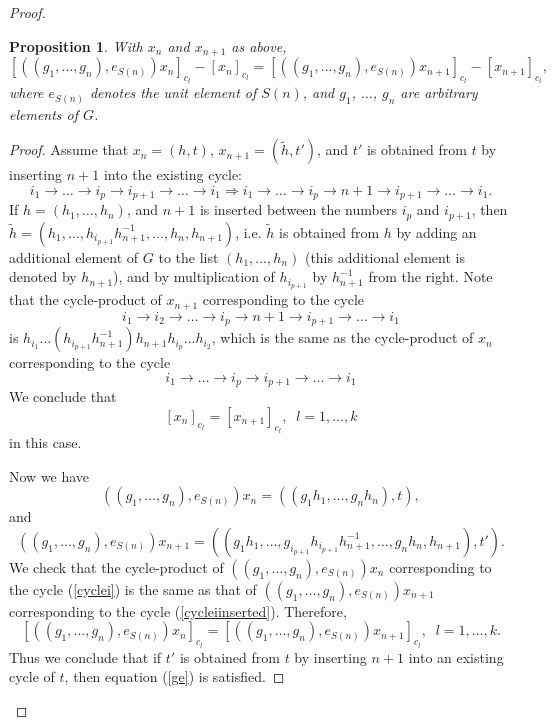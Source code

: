 \documentclass[10pt,a4paper]{amsart}
\newtheorem{prop}{Proposition}
\begin{document}
\begin{proof}
\begin{prop}\label{PROPOSITIONCoW1} With $x_n$ and $x_{n+1}$ as above,
\begin{equation}\label{ge}
\left[\left(\left(g_1,\ldots,g_n\right),e_{S(n)}\right)x_n\right]_{c_l}-\left[x_n\right]_{c_l}
=\left[\left(\left(g_1,\ldots,g_n\right),e_{S(n)}\right)x_{n+1}\right]_{c_l}-\left[x_{n+1}\right]_{c_l},
\end{equation}
where $e_{S(n)}$ denotes the unit element of $S(n)$, and $g_1$, $\ldots$, $g_n$ are arbitrary elements of $G$.
\end{prop}
\begin{proof} Assume that $x_n=(h,t)$, $x_{n+1}=\left(\tilde{h},t'\right)$, and $t'$ is obtained from $t$ by inserting $n+1$ into the existing cycle:
$$
i_1\rightarrow \ldots\rightarrow i_p\rightarrow i_{p+1}\rightarrow\ldots\rightarrow i_1\Longrightarrow
i_1\rightarrow\ldots\rightarrow i_{p}\rightarrow n+1\rightarrow i_{p+1}\rightarrow\ldots\rightarrow i_1.
$$
If $h=\left(h_1,\ldots,h_n\right)$,  and $n+1$ is inserted between the numbers $i_p$ and $i_{p+1}$,
then $\tilde{h}=\left(h_1,\ldots,h_{i_{p+1}}h_{n+1}^{-1},\ldots,h_n,h_{n+1}\right)$,
i.e. $\tilde{h}$ is obtained from $h$ by adding an additional element of $G$ to the list $\left(h_1,\ldots,h_n\right)$
(this additional element is denoted by $h_{n+1}$), and by multiplication of $h_{i_{p+1}}$ by $h_{n+1}^{-1}$ from the right. Note that  the cycle-product of $x_{n+1}$ corresponding to the cycle
\begin{equation}\label{cycleiinserted}
i_1\rightarrow i_2\rightarrow\ldots\rightarrow i_{p}\rightarrow n+1\rightarrow i_{p+1}\rightarrow\ldots\rightarrow i_1
\end{equation}
is $h_{i_1}\ldots\left(h_{i_{p+1}}h_{n+1}^{-1}\right)h_{n+1}h_{i_p}\ldots h_{i_2}$,
which is the same as the cycle-product of $x_n$ corresponding to the cycle
\begin{equation}\label{cyclei}
i_1\rightarrow \ldots\rightarrow i_p\rightarrow i_{p+1}\rightarrow\ldots\rightarrow i_1
\end{equation}
We conclude that
$$
\left[x_n\right]_{c_l}=\left[x_{n+1}\right]_{c_l},\;\; l=1,\ldots, k
$$
in this case.

Now we have
\begin{equation}\label{4.13.a}
\left(\left(g_1,\ldots,g_n\right),e_{S(n)}\right)x_n=\left(\left(g_1h_1,\ldots,g_nh_n\right),t\right),
\end{equation}
and
$$
\left(\left(g_1,\ldots,g_n\right),e_{S(n)}\right)x_{n+1}
=\left(\left(g_1h_1,\ldots,g_{i_{p+1}}h_{i_{p+1}}h_{n+1}^{-1},\ldots,
g_nh_n,h_{n+1}\right),t'\right).
$$
We check that the cycle-product of $\left(\left(g_1,\ldots,g_n\right),e_{S(n)}\right)x_n$ corresponding to the
cycle (\ref{cyclei}) is the same as that of $\left(\left(g_1,\ldots,g_n\right),e_{S(n)}\right)x_{n+1}$
corresponding to the cycle (\ref{cycleiinserted}). Therefore,
$$
\left[\left(\left(g_1,\ldots,g_n\right),e_{S(n)}\right)x_n\right]_{c_l}
=\left[\left(\left(g_1,\ldots,g_n\right),e_{S(n)}\right)x_{n+1}\right]_{c_l}, \;\; l=1,\ldots, k.
$$
Thus we conclude that if $t'$ is obtained from $t$ by inserting $n+1$ into an existing cycle of $t$, then
equation  (\ref{ge}) is satisfied.


\end{proof}
\end{proof}
\end{document}
